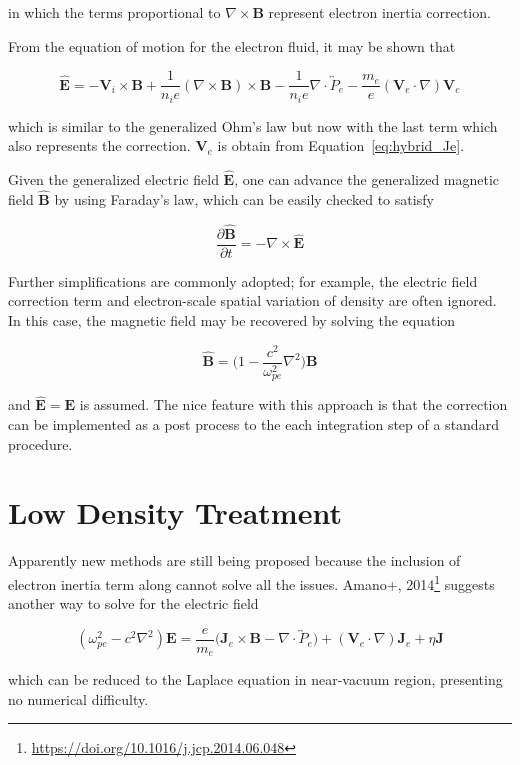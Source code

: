 \documentclass[
  notoc %
]{tufte-book}
\DeclareRobustCommand{\href}[2]{#2\footnote{\url{#1}}}
\begin{document}
in which the terms proportional to \(\nabla\times\mathbf{B}\) represent
electron inertia correction.

From the equation of motion for the electron fluid, it may be shown that

\[
\widehat{\mathbf{E}} = - \mathbf{V}_i \times \mathbf{B} + \frac{1}{n_i e}(\nabla\times\mathbf{B})\times\mathbf{B} - \frac{1}{n_i e}\nabla\cdot\overleftrightarrow{P}_e - \frac{m_e}{e}(\mathbf{V}_e\cdot\nabla)\mathbf{V}_e
\]

which is similar to the generalized Ohm's law but now with the last term
which also represents the correction. \(\mathbf{V}_e\) is obtain from
Equation~\ref{eq:hybrid_Je}.

Given the generalized electric field \(\widehat{\mathbf{E}}\), one can
advance the generalized magnetic field \(\widehat{\mathbf{B}}\) by using
Faraday's law, which can be easily checked to satisfy

\[
\frac{\partial \widehat{\mathbf{B}}}{\partial t} = -\nabla\times\widehat{\mathbf{E}}
\]

Further simplifications are commonly adopted; for example, the electric
field correction term and electron-scale spatial variation of density
are often ignored. In this case, the magnetic field may be recovered by
solving the equation

\[
\widehat{\mathbf{B}} = \big( 1 - \frac{c^2}{\omega_{pe}^2}\nabla^2 \big)\mathbf{B}
\]

and \(\widehat{\mathbf{E}} = \mathbf{E}\) is assumed. The nice feature
with this approach is that the correction can be implemented as a post
process to the each integration step of a standard procedure.

\hypertarget{low-density-treatment}{%
\section{Low Density Treatment}\label{low-density-treatment}}

Apparently new methods are still being proposed because the inclusion of
electron inertia term along cannot solve all the issues.
\href{https://doi.org/10.1016/j.jcp.2014.06.048}{Amano+, 2014} suggests
another way to solve for the electric field

\[
(\omega_{pe}^2 - c^2\nabla^2)\mathbf{E} = \frac{e}{m_e}\big( \mathbf{J}_e \times\mathbf{B} - \nabla\cdot\overleftrightarrow{P}_e \big) + (\mathbf{V}_e\cdot\nabla)\mathbf{J}_e + \eta\mathbf{J}
\]

which can be reduced to the Laplace equation in near-vacuum region,
presenting no numerical difficulty.
\end{document}
